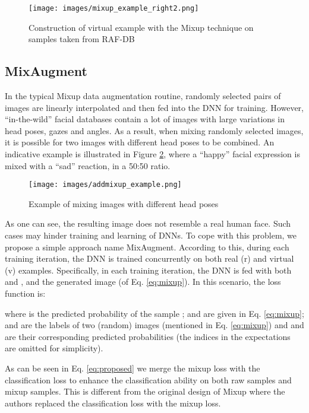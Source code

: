 \documentclass[10pt,twocolumn,letterpaper]{article}
\begin{document}
\begin{figure}[h!]
  \centering
 \texttt{[image: images/mixup\_example\_right2.png]}
 \caption{Construction of virtual example with the Mixup technique on samples taken from RAF-DB}
 \label{fig:mixup}
\end{figure}


\subsection{MixAugment}


In the typical Mixup data augmentation routine, randomly selected pairs of images are linearly interpolated and then fed into the DNN for training. However, \enquote{in-the-wild} facial databases contain a lot of images with large variations in head poses, gazes and angles. As a result, when mixing randomly selected images, it is possible for two images with different head poses to be combined. An indicative example is illustrated in Figure \ref{fig:MixAugment}, where a \enquote{happy} facial expression is mixed with a \enquote{sad} reaction, in a 50:50 ratio.

\begin{figure}[h!]
  \centering
 \texttt{[image: images/addmixup\_example.png]}
 \caption{Example of mixing images with different head poses}
 \label{fig:MixAugment}
\end{figure}

 As one can see, the resulting image does not resemble a real human face. Such cases may hinder training and learning of DNNs.
To cope with this problem, we propose a simple approach name MixAugment. According to this, during each training iteration, the DNN is trained concurrently on both real (r) and virtual (v) examples. Specifically, in each training iteration, the DNN is fed with both  and , and the generated image  (of Eq. \ref{eq:mixup}). In this scenario, the loss function is: 

where    is the predicted probability of the sample ;  and  are given in Eq. \ref{eq:mixup};  and  are the labels of two (random) images (mentioned in Eq. \ref{eq:mixup}) and  and  are their corresponding predicted probabilities (the indices in the expectations are omitted for simplicity).


As can be seen in Eq. \ref{eq:proposed} we merge the mixup loss with the classification loss to enhance the classification ability on both raw samples and mixup samples. This is different from the original design of Mixup \cite{zhang2017mixup} where the authors replaced the classification loss with the mixup loss.
\end{document}
